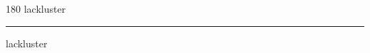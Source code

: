 
\begin{frame}
\begin{center}
\begin{turn}{180}
{\fontsize{2.5cm}{1em}\selectfont lackluster}
\end{turn}
\vspace{1em}\par  
\hrule
\vspace{1em}\par  
{\fontsize{2.5cm}{1em}\selectfont lackluster}
\end{center}
\end{frame}
